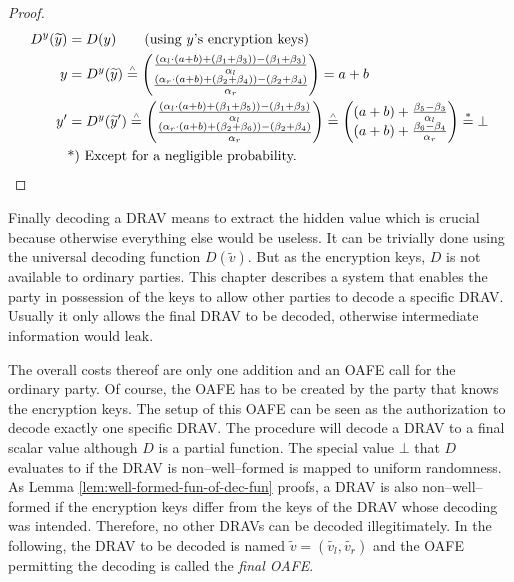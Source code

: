 \begin{proof}
  \begin{align*}
    D^y(\widetilde{y}) &= D(y) \qquad\text{(using $y$'s encryption keys)}\\
    y &= D^y(\widetilde{y}) \stackrel{\scriptscriptstyle\wedge}{=}
    \begin{pmatrix}
      \frac{(\alpha_l \cdot (a+b) + (\beta_1 + \beta_3)) - (\beta_1+\beta_3)}
           {\alpha_l}\\
      \frac{(\alpha_r \cdot (a+b) + (\beta_2 + \beta_4)) - (\beta_2+\beta_4)}
           {\alpha_r}\\
    \end{pmatrix}
    = a+b\\
    y' &= D^y(\widetilde{y}')
    \stackrel{\scriptscriptstyle\wedge}{=}
    \begin{pmatrix}
      \frac{(\alpha_l \cdot (a+b) + (\beta_1 + \beta_5)) - (\beta_1+\beta_3)}
           {\alpha_l}\\
      \frac{(\alpha_r \cdot (a+b) + (\beta_2 + \beta_6)) - (\beta_2+\beta_4)}
           {\alpha_r}\\
    \end{pmatrix}
    \stackrel{\scriptscriptstyle\wedge}{=}
    \begin{pmatrix}
      (a+b) +
      \frac{\beta_5 - \beta_3}{\alpha_l}\\
      (a+b) +
      \frac{\beta_6 - \beta_4}{\alpha_r}\\
    \end{pmatrix}
    \stackrel{*}{=} \bot\\
    &\text{*) Except for a negligible probability.}{}
  \end{align*}
\end{proof}


\label{sec:drav-final-decoding}

Finally decoding a DRAV means to extract the hidden value which is crucial
because otherwise everything else would be useless. It can be trivially done
using the universal decoding function $D(\widetilde{v})$. But as the encryption
keys, $D$ is not available to ordinary parties. This chapter describes a system
that enables the party in possession of the keys to allow other parties to
decode a specific DRAV\@. Usually it only allows the final DRAV to be decoded,
otherwise intermediate information would leak.

The overall costs thereof are only one addition and an OAFE call for the
ordinary party. Of course, the OAFE has to be created by the party that knows
the encryption keys. The setup of this OAFE can be seen as the authorization to
decode exactly one specific DRAV\@. The procedure will decode a DRAV to a final
scalar value although $D$ is a partial function. The special value $\bot$ that
$D$ evaluates to if the DRAV is non--well--formed is mapped to uniform
randomness. As Lemma \ref{lem:well-formed-fun-of-dec-fun} proofs, a DRAV is
also non--well--formed if the encryption keys differ from the keys of the DRAV
whose decoding was intended. Therefore, no other DRAVs can be decoded
illegitimately. In the following, the DRAV to be decoded is named $\widetilde{v}
= (\widetilde{v_l}, \widetilde{v_r})$ and the OAFE permitting the decoding is
called the \emph{final OAFE}.

